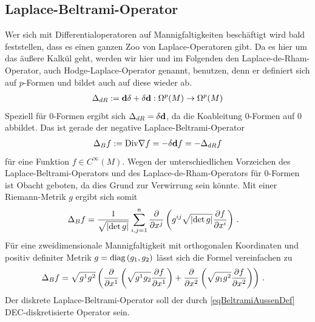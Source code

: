   \subsection{Laplace-Beltrami-Operator}
    \label{subsecLaplaceBeltrami}
    Wer sich mit Differentialoperatoren auf Mannigfaltigkeiten beschäftigt wird bald feststellen, dass es
    einen ganzen Zoo von Laplace-Operatoren gibt.
    Da es hier um das äußere Kalkül geht, werden wir hier und im Folgenden den Laplace-de-Rham-Operator,
    auch Hodge-Laplace-Operator genannt, benutzen, denn er definiert sich auf \( p \)-Formen und bildet
    auch auf diese wieder ab.
    \begin{align}
      \Delta_{dR} := \mathbf{d}\delta + \delta\mathbf{d}: \Omega^{p}(M) \rightarrow \Omega^{p}(M)
    \end{align}
    Speziell für \( 0 \)-Formen ergibt sich \( \Delta_{dR} = \delta\mathbf{d} \), da die Koableitung \( 0
    \)-Formen auf \( 0 \) abbildet.
    Das ist gerade der negative Laplace-Beltrami-Operator
    \begin{align}
      \label{eqBeltramiAussenDef}
      \Delta_{B}f := \text{Div}\nabla f = -\delta\mathbf{d} f = -\Delta_{dR} f
    \end{align}
    für eine Funktion \( f\in C^{\infty}(M) \).
    Wegen der unterschiedlichen Vorzeichen des Laplace-Beltrami-Operators und des Laplace-de-Rham-Operators
    für \( 0 \)-Formen ist Obacht geboten, da dies Grund zur Verwirrung sein könnte.
    Mit einer Riemann-Metrik \( g \) ergibt sich somit
    \begin{align}
      \Delta_{B} f &= \frac{1}{\sqrt{\left| \det g \right|}} \sum_{i,j=1}^{n} \frac{\partial}{\partial x^{j}} \left( g^{ij}\sqrt{\left| \det g \right|} \frac{\partial f}{\partial x^{i}}
      \right) \,\text{.}
    \end{align}
    Für eine zweidimensionale Mannigfaltigkeit mit orthogonalen Koordinaten und 
    positiv definiter Metrik \( g=\text{diag}\left( g_{1},g_{2} \right) \) lässt sich die Formel vereinfachen zu
    \begin{align}
    \label{eqLaplaceBeltramiOrthogonal}
      \Delta_{B} f &=\sqrt{g^{1}g^{2}} \left(  \frac{\partial}{\partial x^{1}} \left( \sqrt{g^{1}g_{2}} \frac{\partial f}{\partial x^{1}} \right) 
                                             + \frac{\partial}{\partial x^{2}} \left( \sqrt{g_{1}g^{2}} \frac{\partial f}{\partial x^{2}} \right) \right) \,\text{.}
    \end{align}
    Der diskrete Laplace-Beltrami-Operator soll der durch \eqref{eqBeltramiAussenDef} DEC-diskretisierte Operator sein.
